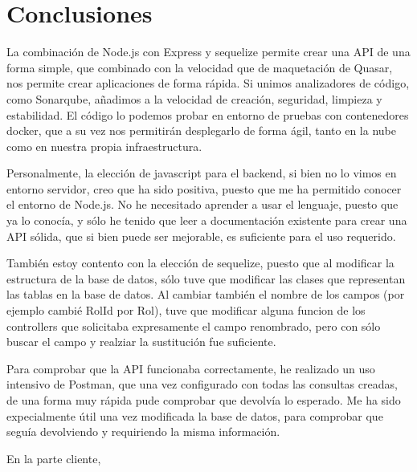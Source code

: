 \documentclass[11pt,spanish,listoffigures,listoftables]{tfgetsinf}
\begin{document}

\chapter{Conclusiones}

La combinación de Node.js con Express y sequelize permite crear una API de una forma simple, que combinado con la velocidad que de maquetación de Quasar, nos permite crear aplicaciones de forma rápida.
Si unimos analizadores de código, como Sonarqube, añadimos a la velocidad de creación, seguridad, limpieza y estabilidad. 
El código lo podemos probar en entorno de pruebas con contenedores docker, que a su vez nos permitirán desplegarlo de forma ágil, tanto en la nube como en nuestra propia infraestructura.

Personalmente, la elección de javascript para el backend, si bien no lo vimos en entorno servidor, creo que ha sido positiva, puesto que me ha permitido conocer el entorno de Node.js. 
No he necesitado aprender a usar el lenguaje, puesto que ya lo conocía, y sólo he tenido que leer a documentación existente para crear una API sólida, que si bien puede ser mejorable, es suficiente para el uso requerido.

También estoy contento con la elección de sequelize, puesto que al modificar la estructura de la base de datos, sólo tuve que modificar las clases que representan las tablas en la base de datos. 
Al cambiar también el nombre de los campos (por ejemplo cambié RolId por Rol), tuve que modificar alguna funcion de los controllers que solicitaba expresamente el campo renombrado, pero con sólo buscar el campo y realziar la sustitución fue suficiente.

Para comprobar que la API funcionaba correctamente, he realizado un uso intensivo de Postman, que una vez configurado con todas las consultas creadas, de una forma muy rápida pude comprobar que devolvía lo esperado.
Me ha sido expecialmente útil una vez modificada la base de datos, para comprobar que seguía devolviendo y requiriendo la misma información. 

En la parte cliente, 

\end{document}
